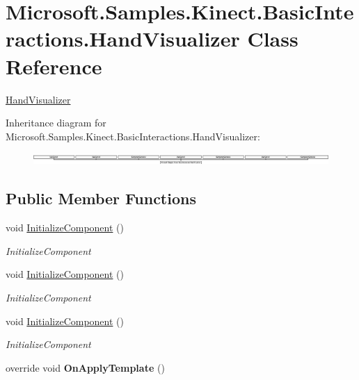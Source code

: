 \hypertarget{class_microsoft_1_1_samples_1_1_kinect_1_1_basic_interactions_1_1_hand_visualizer}{\section{Microsoft.\-Samples.\-Kinect.\-Basic\-Interactions.\-Hand\-Visualizer Class Reference}
\label{class_microsoft_1_1_samples_1_1_kinect_1_1_basic_interactions_1_1_hand_visualizer}
}


\hyperlink{class_microsoft_1_1_samples_1_1_kinect_1_1_basic_interactions_1_1_hand_visualizer}{Hand\-Visualizer}  


Inheritance diagram for Microsoft.\-Samples.\-Kinect.\-Basic\-Interactions.\-Hand\-Visualizer\-:\begin{figure}[H]
\begin{center}
\leavevmode
\includegraphics[height=0.453258cm]{class_microsoft_1_1_samples_1_1_kinect_1_1_basic_interactions_1_1_hand_visualizer}
\end{center}
\end{figure}
\subsection*{Public Member Functions}
\begin{DoxyCompactItemize}
\item 
void \hyperlink{class_microsoft_1_1_samples_1_1_kinect_1_1_basic_interactions_1_1_hand_visualizer_ad0ce0f55b8d0883043cf9dfebc909196}{Initialize\-Component} ()
\begin{DoxyCompactList}\small\item\em Initialize\-Component \end{DoxyCompactList}\item 
void \hyperlink{class_microsoft_1_1_samples_1_1_kinect_1_1_basic_interactions_1_1_hand_visualizer_ad0ce0f55b8d0883043cf9dfebc909196}{Initialize\-Component} ()
\begin{DoxyCompactList}\small\item\em Initialize\-Component \end{DoxyCompactList}\item 
void \hyperlink{class_microsoft_1_1_samples_1_1_kinect_1_1_basic_interactions_1_1_hand_visualizer_ad0ce0f55b8d0883043cf9dfebc909196}{Initialize\-Component} ()
\begin{DoxyCompactList}\small\item\em Initialize\-Component \end{DoxyCompactList}\item 
\hypertarget{class_microsoft_1_1_samples_1_1_kinect_1_1_basic_interactions_1_1_hand_visualizer_aa8b88164de4de32572cfc3c8a44dd469}{override void {\bfseries On\-Apply\-Template} ()}\label{class_microsoft_1_1_samples_1_1_kinect_1_1_basic_interactions_1_1_hand_visualizer_aa8b88164de4de32572cfc3c8a44dd469}

\end{DoxyCompactItemize}
